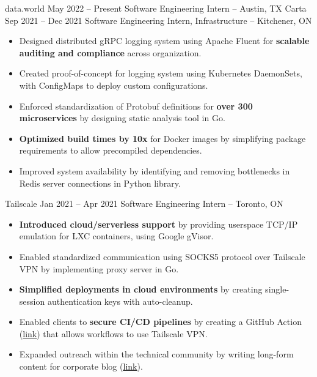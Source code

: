 \documentclass{article}
\begin{document}
\normalsize
\WorkEntry
{data.world}
{May 2022 -- Present}
{Software Engineering Intern -- Austin, TX}
{}
\WorkEntry
{Carta}
{Sep 2021 -- Dec 2021}
{Software Engineering Intern, Infrastructure -- Kitchener, ON}
{
\begin{itemize} \itemsep -1pt
    \item Designed distributed gRPC logging system using Apache Fluent for \textbf{scalable auditing and compliance} across organization.
    \item Created proof-of-concept for logging system using Kubernetes DaemonSets, with ConfigMaps to deploy custom configurations.
    \item Enforced standardization of Protobuf definitions for \textbf{over 300 microservices} by designing static analysis tool in Go.
    \item \textbf{Optimized build times by 10x} for Docker images by simplifying package requirements to allow precompiled dependencies.
    \item Improved system availability by identifying and removing bottlenecks in Redis server connections in Python library.
\end{itemize}}
\iffalse
Made Tailscale ready for the cloud, by creating features that allowed it to run in lightweight, unprivileged container environments. This included a virtual networking stack for connecting to the Tailscale network without kernel privileges to create a network driver, a SOCKS5 proxy to allow applications to communicate over this virtual networking stack, and ephemeral authentication keys for stateless access to the Tailscale network. Also published long-form technical content on company blog (https://tailscale.com/blog/2021-05-github-actions-and-tailscale/) and contributed to product knowledge base.
\fi
\WorkEntry
{Tailscale}
{Jan 2021 -- Apr 2021}
{Software Engineering Intern -- Toronto, ON}
{\begin{itemize} \itemsep -1pt
    \item \textbf{Introduced cloud/serverless support} by providing userspace TCP/IP emulation for LXC containers, using Google gVisor.
    \item Enabled standardized communication using SOCKS5 protocol over Tailscale VPN by implementing proxy server in Go.
    \item \textbf{Simplified deployments in cloud environments} by creating single-session authentication keys with auto-cleanup.
    \item Enabled clients to \textbf{secure CI/CD pipelines} by creating a GitHub Action (\underline{\href{https://github.com/tailscale/github-action}{link}}) that allows workflows to use Tailscale VPN. %
    \item Expanded outreach within the technical community by writing long-form content for corporate blog (\underline{\href{https://tailscale.com/blog/2021-05-github-actions-and-tailscale/}{link}}).
    \end{itemize}}
\end{document}
